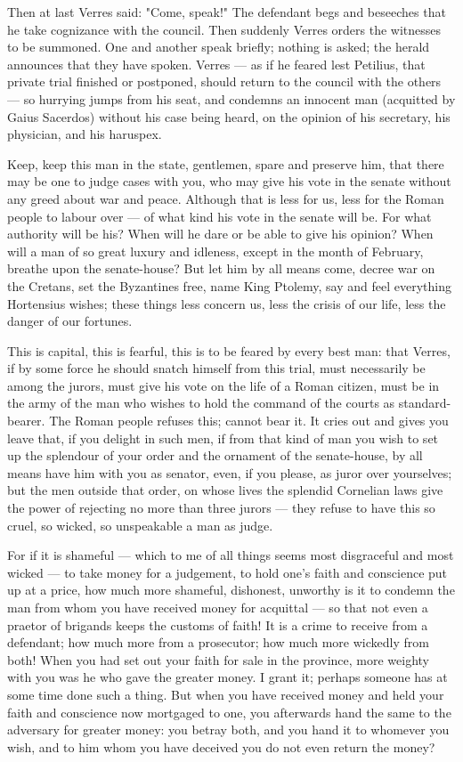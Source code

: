  Then at last Verres said: "Come, speak!" The defendant begs and beseeches that he take cognizance with the council. Then suddenly Verres orders the witnesses to be summoned. One and another speak briefly; nothing is asked; the herald announces that they have spoken. Verres --- as if he feared lest Petilius, that private trial finished or postponed, should return to the council with the others --- so hurrying jumps from his seat, and condemns an innocent man (acquitted by Gaius Sacerdos) without his case being heard, on the opinion of his secretary, his physician, and his haruspex.

 Keep, keep this man in the state, gentlemen, spare and preserve him, that there may be one to judge cases with you, who may give his vote in the senate without any greed about war and peace. Although that is less for us, less for the Roman people to labour over --- of what kind his vote in the senate will be. For what authority will be his? When will he dare or be able to give his opinion? When will a man of so great luxury and idleness, except in the month of February, breathe upon the senate-house? But let him by all means come, decree war on the Cretans, set the Byzantines free, name King Ptolemy, say and feel everything Hortensius wishes; these things less concern us, less the crisis of our life, less the danger of our fortunes.

 This is capital, this is fearful, this is to be feared by every best man: that Verres, if by some force he should snatch himself from this trial, must necessarily be among the jurors, must give his vote on the life of a Roman citizen, must be in the army of the man who wishes to hold the command of the courts as standard-bearer. The Roman people refuses this; cannot bear it. It cries out and gives you leave that, if you delight in such men, if from that kind of man you wish to set up the splendour of your order and the ornament of the senate-house, by all means have him with you as senator, even, if you please, as juror over yourselves; but the men outside that order, on whose lives the splendid Cornelian laws give the power of rejecting no more than three jurors --- they refuse to have this so cruel, so wicked, so unspeakable a man as judge.

 For if it is shameful --- which to me of all things seems most disgraceful and most wicked --- to take money for a judgement, to hold one's faith and conscience put up at a price, how much more shameful, dishonest, unworthy is it to condemn the man from whom you have received money for acquittal --- so that not even a praetor of brigands keeps the customs of faith! It is a crime to receive from a defendant; how much more from a prosecutor; how much more wickedly from both! When you had set out your faith for sale in the province, more weighty with you was he who gave the greater money. I grant it; perhaps someone has at some time done such a thing. But when you have received money and held your faith and conscience now mortgaged to one, you afterwards hand the same to the adversary for greater money: you betray both, and you hand it to whomever you wish, and to him whom you have deceived you do not even return the money?

